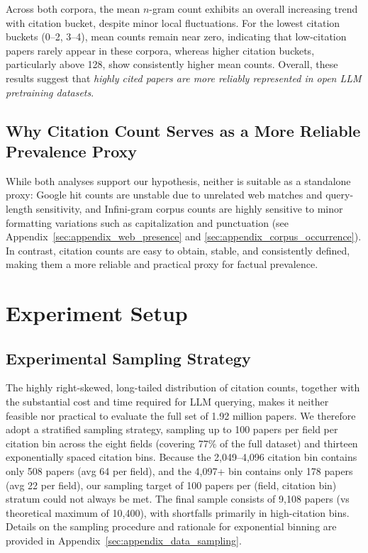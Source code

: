 \documentclass[11pt]{article}
\begin{document}
Across both corpora, the mean $n$-gram count exhibits an overall increasing trend with citation bucket, despite minor local fluctuations. For the lowest citation buckets (0–2, 3–4), mean counts remain near zero, indicating that low-citation papers rarely appear in these corpora, whereas higher citation buckets, particularly above 128, show consistently higher mean counts. Overall, these results suggest that \emph{highly cited papers are more reliably represented in open LLM pretraining datasets}.

\subsection{Why Citation Count Serves as a More Reliable Prevalence Proxy}

While both analyses support our hypothesis, neither is suitable as a standalone proxy: Google hit counts are unstable due to unrelated web matches and query-length sensitivity, and Infini-gram corpus counts are highly sensitive to minor formatting variations such as capitalization and punctuation (see Appendix~\ref{sec:appendix_web_presence} and \ref{sec:appendix_corpus_occurrence}). In contrast, citation counts are easy to obtain, stable, and consistently defined, making them a more reliable and practical proxy for factual prevalence.

\section{Experiment Setup}
\label{sec:methodology}

\subsection{Experimental Sampling Strategy}

The highly right-skewed, long-tailed distribution of citation counts, together with the substantial cost and time required for LLM querying, makes it neither feasible nor practical to evaluate the full set of 1.92 million papers. We therefore adopt a stratified sampling strategy, sampling up to 100 papers per field per citation bin across the eight fields (covering 77\% of the full dataset) and thirteen exponentially spaced citation bins.
Because the 2,049–4,096 citation bin contains only 508 papers (avg 64 per field), and the 4,097+ bin contains only 178 papers (avg 22 per field), our sampling target of 100 papers per (field, citation bin) stratum could not always be met. The final sample consists of 9,108 papers (vs theoretical maximum of 10,400), with shortfalls primarily in high-citation bins. Details on the sampling procedure and rationale for exponential binning are provided in Appendix~\ref{sec:appendix_data_sampling}.
\end{document}
